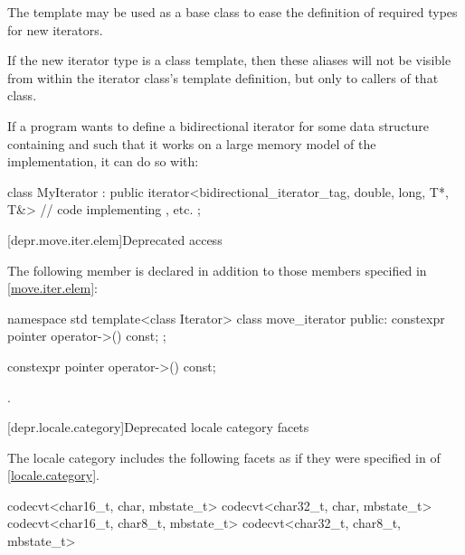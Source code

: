 \pnum
The
template may be used as a base class to ease the definition of required types
for new iterators.

\pnum
\begin{note}
If the new iterator type is a class template, then these aliases
will not be visible from within the iterator class's template definition, but
only to callers of that class.
\end{note}

\pnum
\begin{example}
If a \Cpp{} program wants to define a bidirectional iterator for some data
structure containing  and such that it works on a large memory
model of the implementation, it can do so with:

\begin{codeblock}
class MyIterator :
  public iterator<bidirectional_iterator_tag, double, long, T*, T&> {
  // code implementing \tcode{++}, etc.
};
\end{codeblock}
\end{example}

[depr.move.iter.elem]{Deprecated  access}

\pnum
The following member is declared in addition to those members
specified in \ref{move.iter.elem}:

\begin{codeblock}
namespace std {
  template<class Iterator>
  class move_iterator {
  public:
    constexpr pointer operator->() const;
  };
}
\end{codeblock}

%
\begin{itemdecl}
constexpr pointer operator->() const;
\end{itemdecl}

\begin{itemdescr}
\pnum
\returns
{}.
\end{itemdescr}

[depr.locale.category]{Deprecated locale category facets}

\pnum
The  locale category includes the following facets
as if they were specified
in  of \ref{locale.category}.

\begin{codeblock}
codecvt<char16_t, char, mbstate_t>
codecvt<char32_t, char, mbstate_t>
codecvt<char16_t, char8_t, mbstate_t>
codecvt<char32_t, char8_t, mbstate_t>
\end{codeblock}

